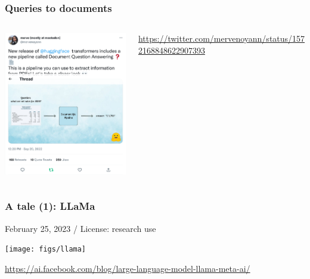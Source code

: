 \documentclass[17pt,aspectratio=169,hyperref={pdfusetitle,colorlinks,allcolors=olive}]{beamer}
\begin{document}
\begin{frame}[fragile]
  \frametitle{Queries to documents}

  \begin{columns}[T]
    \begin{column}{.58\textwidth}
      \includegraphics[width=7.5cm]{figs/pdf-extract}
    \end{column}%
    \hfill%
    \begin{column}{.38\textwidth}
      \vspace{1.5cm}
    {\scriptsize
      \url{https://twitter.com/mervenoyann/status/1572168848622907393}
    }
    \end{column}%
  \end{columns}

\end{frame}

\begin{frame}[fragile]
  \frametitle{A tale (1): LLaMa}

  February 25, 2023 / License: research use

  \texttt{[image: figs/llama]}
  
  \begin{flushright}
    {\scriptsize
      \url{https://ai.facebook.com/blog/large-language-model-llama-meta-ai/}
    }
  \end{flushright}

\end{frame}
\end{document}
